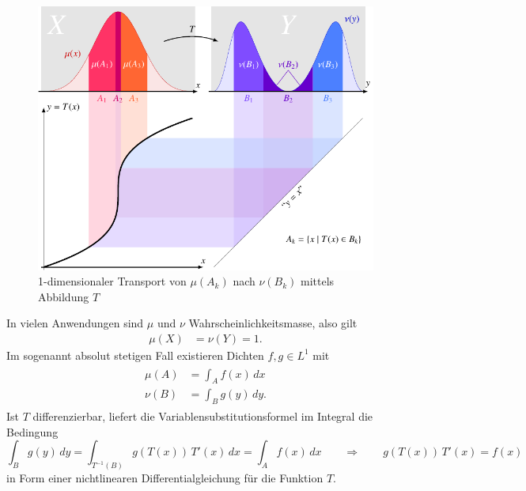 \begin{figure}
\centering
\includegraphics{papers/mongekant/images/t}
\caption{1-dimensionaler Transport von $\mu(A_k)$ nach $\nu(B_k)$ mittels Abbildung $T$}
\label{mongekant:fig:optimal_transport}
\end{figure}

In vielen Anwendungen sind $\mu$ und $\nu$ Wahrscheinlichkeitsmasse,
also gilt
\begin{align*}
\mu(X)
&=
\nu(Y)
=
1
.
\end{align*}
Im sogenannt absolut stetigen Fall
existieren Dichten $f,g\in L^{1}$ mit
\begin{align}
\begin{aligned}
\mu(A)
&=
\int_A f(x) \, dx
\\
\nu(B)
&=
\int_B g(y) \, dy
.
\end{aligned}
\label{mongekant:eq:absolute_continuity}
\end{align}
Ist $T$ differenzierbar, liefert die Variablensubstitutionsformel im Integral
die Bedingung
\[
\int_B g(y)\,dy
=
\int_{T^{-1}(B)} g(T(x))\, T'(x)\,dx
=
\int_A f(x)\,dx
\qquad\Rightarrow\qquad
g(T(x))\, T'(x) = f(x)
\]
in Form einer nichtlinearen Differentialgleichung für die Funktion $T$.

